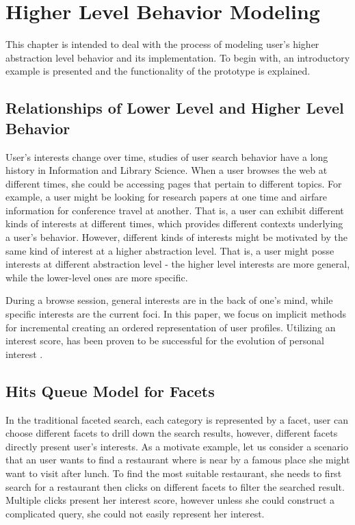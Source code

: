 \chapter{Higher Level Behavior Modeling}

This chapter is intended to deal with the process of modeling user's higher abstraction level behavior and its implementation. To begin with, an introductory example is presented and the functionality of the prototype is explained.

\section{Relationships of Lower Level and Higher Level Behavior}

User's interests change over time, studies of user search behavior have a long history in Information and Library Science\cite{Bates1979}\cite{Rose}\cite{Spink2002}. When a user browses the web at different times, she could be accessing pages that pertain to different topics. For example, a user might be looking for research papers at one time and airfare information for conference travel at another. That is, a user can exhibit different kinds of interests at different times, which provides different contexts underlying a user's behavior. However, different kinds of interests might be motivated by the same kind of interest at a higher abstraction level. That is, a user might posse interests at different abstraction level - the higher level interests are more general, while the lower-level ones are more specific.

During a browse session, general interests are in the back of one's mind, while specific interests are the current foci. In this paper, we focus on implicit methods for incremental creating an ordered representation of user profiles. Utilizing an interest score, has been proven to be successful for the evolution of personal interest \cite{Sieg2007}. 

\section{Hits Queue Model for Facets}

In the traditional faceted search, each category is represented by a facet, user can choose different facets to drill down the search results, however, different facets directly present user's interests. As a motivate example, let us consider a scenario that an user wants to find a restaurant where is near by a famous place she might want to visit after lunch. To find the most suitable restaurant, she needs to first search for a restaurant then clicks on different facets to filter the searched result. Multiple clicks present her interest score, however unless she could construct a complicated query, she could not easily represent her interest.

